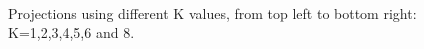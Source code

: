 \documentclass[a4paper,12pt]{article}
\begin{document}
\begin{figure}
~
~
\caption{Projections using different K values, from top left to bottom right: K=1,2,3,4,5,6 and 8.}
\label{fig:DifferentKs}
\end{figure}
\end{document}

